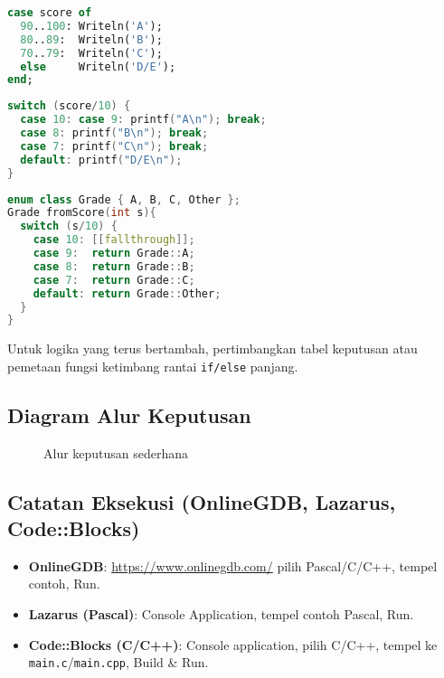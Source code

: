 \documentclass[../main.tex]{subfiles}
\begin{document}
\begin{lstlisting}[language=Pascal, caption={case of dengan rentang}]
case score of
  90..100: Writeln('A');
  80..89:  Writeln('B');
  70..79:  Writeln('C');
  else     Writeln('D/E');
end;
\end{lstlisting}

\begin{lstlisting}[language=C, caption={switch di C dengan break}]
switch (score/10) {
  case 10: case 9: printf("A\n"); break;
  case 8: printf("B\n"); break;
  case 7: printf("C\n"); break;
  default: printf("D/E\n");
}
\end{lstlisting}

\begin{lstlisting}[language=C++, caption={switch modern dengan enum class dan [[fallthrough]]}]
enum class Grade { A, B, C, Other };
Grade fromScore(int s){
  switch (s/10) {
    case 10: [[fallthrough]];
    case 9:  return Grade::A;
    case 8:  return Grade::B;
    case 7:  return Grade::C;
    default: return Grade::Other;
  }
}
\end{lstlisting}

Untuk logika yang terus bertambah, pertimbangkan tabel keputusan atau pemetaan fungsi ketimbang rantai \texttt{if/else} panjang.

\subsection{Diagram Alur Keputusan}
\begin{figure}[h]
  \centering
  \caption{Alur keputusan sederhana}
\end{figure}

\subsection{Catatan Eksekusi (OnlineGDB, Lazarus, Code::Blocks)}
\begin{itemize}
  \item \textbf{OnlineGDB}: \url{https://www.onlinegdb.com/} \textrightarrow{} pilih Pascal/C/C++, tempel contoh, Run.
  \item \textbf{Lazarus (Pascal)}: Console Application, tempel contoh Pascal, Run.
  \item \textbf{Code::Blocks (C/C++)}: Console application, pilih C/C++, tempel ke \texttt{main.c}/\texttt{main.cpp}, Build \& Run.
\end{itemize}
\end{document}
